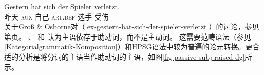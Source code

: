 {%
\ea
\label{ex-gestern-hat-sich-der-spieler-verletzt}
\gll Gestern hat sich der Spieler verletzt.\\
     昨天 \textsc{aux} 自己 \textsc{art}.\textsc{def} 选手 受伤\\
\z
关于Groß \& Osborne对（\ref{ex-gestern-hat-sich-der-spieler-verletzt}）的讨论，参见第\pageref{fig-gestern-hat-sich-der-spieler-verletzt-dg-rising}页。
} 
 \citet{Hudson90a-u}、 \citet[\S~5.3]{Eroms2000a}和 \citet{GO2009a}认为主语依存于助动词，而不是主动词。
%
%
%
%
这需要范畴语法（参见\ref{Kategorialgrammatik-Komposition}）和HPSG语法\citep{HN94a}中较为普遍的论元转换。更合适的分析是将分词的主语当作助动词的主语，如图\vref{fig-passive-subj-raised-dg}所示。
